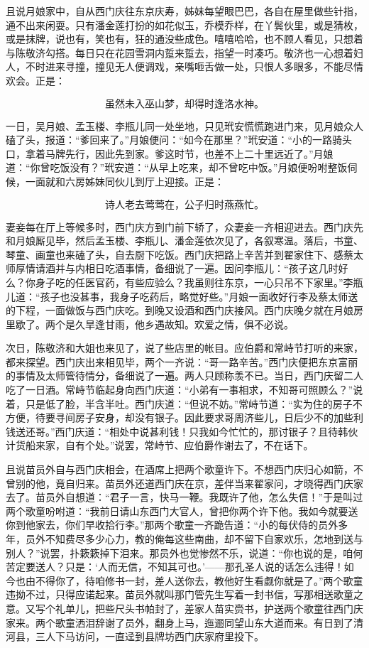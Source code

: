 且说月娘家中，自从西门庆往东京庆寿，姊妹每望眼巴巴，各自在屋里做些针指，通不出来闲耍。只有潘金莲打扮的如花似玉，乔模乔样，在丫鬓伙里，或是猜枚，或是抹牌，说也有，笑也有，狂的通没些成色。嘻嘻哈哈，也不顾人看见，只想着与陈敬济勾搭。每日只在花园雪洞内踅来踅去，指望一时凑巧。敬济也一心想着妇人，不时进来寻撞，撞见无人便调戏，亲嘴咂舌做一处，只恨人多眼多，不能尽情欢会。正是：

\[
虽然未入巫山梦，却得时逢洛水神。
\]

一日，吴月娘、孟玉楼、李瓶儿同一处坐地，只见玳安慌慌跑进门来，见月娘众人磕了头，报道：“爹回来了。”月娘便问：“如今在那里？”玳安道：“小的一路骑头口，拿着马牌先行，因此先到家。爹这时节，也差不上二十里远近了。”月娘道：“你曾吃饭没有？”玳安道：“从早上吃来，却不曾吃中饭。”月娘便吩咐整饭伺候，一面就和六房姊妹同伙儿到厅上迎接。正是：

\[
诗人老去莺莺在，公子归时燕燕忙。
\]

妻妾每在厅上等候多时，西门庆方到门前下轿了，众妻妾一齐相迎进去。西门庆先和月娘厮见毕，然后孟玉楼、李瓶儿、潘金莲依次见了，各叙寒温。落后，书童、琴童、画童也来磕了头，自去厨下吃饭。西门庆把路上辛苦并到翟家住下、感蔡太师厚情请酒并与内相日吃酒事情，备细说了一遍。因问李瓶儿：“孩子这几时好么？你身子吃的任医官药，有些应验么？我虽则往东京，一心只吊不下家里。”李瓶儿道：“孩子也没甚事，我身子吃药后，略觉好些。”月娘一面收好行李及蔡太师送的下程，一面做饭与西门庆吃。到晚又设酒和西门庆接风。西门庆晚夕就在月娘房里歇了。两个是久旱逢甘雨，他乡遇故知。欢爱之情，俱不必说。

次日，陈敬济和大姐也来见了，说了些店里的帐目。应伯爵和常峙节打听的来家，都来探望。西门庆出来相见毕，两个一齐说：“哥一路辛苦。”西门庆便把东京富丽的事情及太师管待情分，备细说了一遍。两人只顾称羡不已。当日，西门庆留二人吃了一日酒。常峙节临起身向西门庆道：“小弟有一事相求，不知哥可照顾么？”说着，只是低了脸，半含半吐。西门庆道：“但说不妨。”常峙节道：“实为住的房子不方便，待要寻间房子安身，却没有银子。因此要求哥周济些儿，日后少不的加些利钱送还哥。”西门庆道：“相处中说甚利钱！只我如今忙忙的，那讨银子？且待韩伙计货船来家，自有个处。”说罢，常峙节、应伯爵作谢去了，不在话下。

且说苗员外自与西门庆相会，在酒席上把两个歌童许下。不想西门庆归心如箭，不曾别的他，竟自归来。苗员外还道西门庆在京，差伴当来翟家问，才晓得西门庆家去了。苗员外自想道：“君子一言，快马一鞭。我既许了他，怎么失信！”于是叫过两个歌童吩咐道：“我前日请山东西门大官人，曾把你两个许下他。我如今就要送你到他家去，你们早收拾行李。”那两个歌童一齐跪告道：“小的每伏侍的员外多年，员外不知费尽多少心力，教的俺每这些南曲，却不留下自家欢乐，怎地到送与别人？”说罢，扑簌簌掉下泪来。那员外也觉惨然不乐，说道：“你也说的是，咱何苦定要送人？只是：‘人而无信，不知其可也。’——那孔圣人说的话怎么违得！如今也由不得你了，待咱修书一封，差人送你去，教他好生看觑你就是了。”两个歌童违拗不过，只得应诺起来。苗员外就叫那门管先生写着一封书信，写那相送歌童之意。又写个礼单儿，把些尺头书帕封了，差家人苗实赍书，护送两个歌童往西门庆家来。两个歌童洒泪辞谢了员外，翻身上马，迤逦同望山东大道而来。有日到了清河县，三人下马访问，一直迳到县牌坊西门庆家府里投下。

